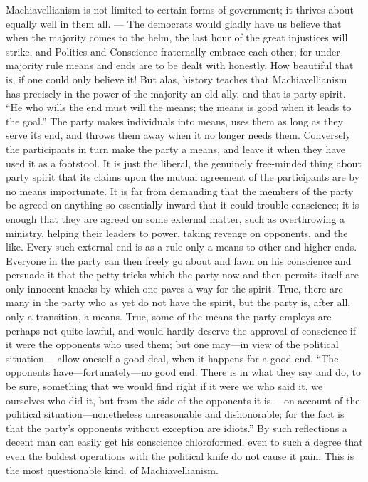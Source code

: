 \documentclass[12pt,a4paper,openany]{book}
\newcommand{\opage}[1]{\marginnote{\footnotesize\textit{[#1]}}}
\begin{document}
Machiavellianism is not limited to certain
forms of government; it thrives about equally well in them
all. --- The democrats would gladly have us believe that when
the majority comes to the helm, the last hour of the great injustices
will strike, and Politics and Conscience
fraternally embrace each other; for under
\setcounter{footnote}{0}%
\opage{101}majority rule means and ends are to be dealt with honestly.
How beautiful that is, if one could only believe it!
But alas, history teaches that Machiavellianism
has precisely in the power of the majority an old ally,
and that is party spirit. ``He who wills the end must
will the means; the means is good when it leads to the
goal.'' The party makes individuals into means, uses
them as long as they serve its end, and throws them
away when it no longer needs them. Conversely
the participants in turn make the party a means, and leave
it when they have used it as a footstool. It is
just the liberal, the genuinely free-minded thing about party spirit
that its claims upon the mutual agreement of the participants
are by no means importunate. It is far from
demanding that the members of the party be agreed
on anything so essentially inward that it could trouble
conscience; it is enough that they are agreed on some
external matter, such as overthrowing a ministry, helping
their leaders to power, taking revenge on opponents,
and the like. Every such external end is as
a rule only a means to other and higher ends.
Everyone in the party can then freely go about and fawn
on his conscience and persuade it that the petty tricks
which the party now and then permits itself are only innocent knacks
by which one paves a way for the spirit. True, there are
many in the party who as yet do not have the spirit, but
the party is, after all, only a transition, a means. True,
some of the means the party employs are perhaps not
quite lawful, and would hardly deserve the approval of
conscience if it were the opponents who used them;
but one may---in view of the political situation---
allow oneself a good deal, when it happens for a good end.
\setcounter{footnote}{0}%
\opage{102}``The opponents have---fortunately---no good end.
There is in what they say and do, to be sure, something that we
would find right if it were we who said it,
we ourselves who did it, but from the side of the opponents it is
---on account of the political situation---nonetheless
unreasonable and dishonorable; for the fact is that the party's
opponents without exception are idiots.'' By
such reflections a decent man can easily get his
conscience chloroformed, even to such a degree that even
the boldest operations with the political knife do not
cause it pain. This is the most questionable kind.
of Machiavellianism.
\end{document}
